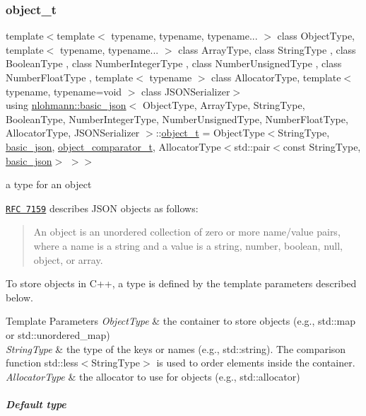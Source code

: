 \subsubsection{\texorpdfstring{object\+\_\+t}{object\_t}}
{\footnotesize\ttfamily template$<$template$<$ typename, typename, typename... $>$ class Object\+Type, template$<$ typename, typename... $>$ class Array\+Type, class String\+Type , class Boolean\+Type , class Number\+Integer\+Type , class Number\+Unsigned\+Type , class Number\+Float\+Type , template$<$ typename $>$ class Allocator\+Type, template$<$ typename, typename=void $>$ class J\+S\+O\+N\+Serializer$>$ \\
using \hyperlink{classnlohmann_1_1basic__json}{nlohmann\+::basic\+\_\+json}$<$ Object\+Type, Array\+Type, String\+Type, Boolean\+Type, Number\+Integer\+Type, Number\+Unsigned\+Type, Number\+Float\+Type, Allocator\+Type, J\+S\+O\+N\+Serializer $>$\+::\hyperlink{classnlohmann_1_1basic__json_a5e48a7893520e1314bf0c9723e26ea2a}{object\+\_\+t} =  Object\+Type$<$String\+Type, \hyperlink{classnlohmann_1_1basic__json}{basic\+\_\+json}, \hyperlink{classnlohmann_1_1basic__json_abed9e77c5fcfc925fcdd489911069c3b}{object\+\_\+comparator\+\_\+t}, Allocator\+Type$<$std\+::pair$<$const String\+Type, \hyperlink{classnlohmann_1_1basic__json}{basic\+\_\+json}$>$ $>$$>$}



a type for an object 

\href{http://rfc7159.net/rfc7159}{\tt R\+FC 7159} describes J\+S\+ON objects as follows\+: \begin{quote}
An object is an unordered collection of zero or more name/value pairs, where a name is a string and a value is a string, number, boolean, null, object, or array. \end{quote}


To store objects in C++, a type is defined by the template parameters described below.


\begin{DoxyTemplParams}{Template Parameters}
{\em Object\+Type} & the container to store objects (e.\+g., {\ttfamily std\+::map} or {\ttfamily std\+::unordered\+\_\+map}) \\
\hline
{\em String\+Type} & the type of the keys or names (e.\+g., {\ttfamily std\+::string}). The comparison function {\ttfamily std\+::less$<$String\+Type$>$} is used to order elements inside the container. \\
\hline
{\em Allocator\+Type} & the allocator to use for objects (e.\+g., {\ttfamily std\+::allocator})\\
\hline
\end{DoxyTemplParams}
\subparagraph*{Default type}

